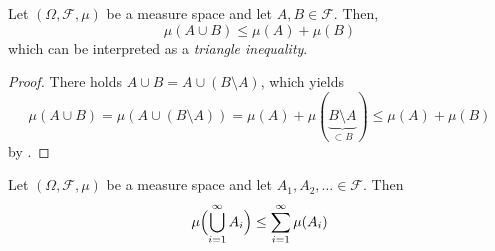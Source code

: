 \begin{theorem}\label{thm:triangle-inequality}
Let $(\Omega,\mathcal{F},\mu)$ be a measure space and let $A,B \in \mathcal{F}$.
Then,
\[
  \mu(A \cup B) \le \mu(A) + \mu(B)
\]
which can be interpreted as a \emph{triangle inequality}.
\end{theorem}

\begin{proof}
There holds $A \cup B = A \cup (B \setminus A)$, which yields
\[
\mu(A \cup B)
=
\mu(A \cup (B \setminus A))
=
\mu(A) + \mu(\underbrace{B \setminus A}_{\subset B})
\le
\mu(A) + \mu(B)
\]
by .
\end{proof}

\begin{theorem}[\textcolor{red}{countable subadditivity}]\label{thm:countable-subadditivity}
Let $(\Omega,\mathcal{F},\mu)$ be a measure space and let $A_1,A_2,\dots \in \mathcal{F}$.
Then
\begin{equation}\label{eq:countable-subadditivity}
\mu\Bigl(\bigcup_{i=1}^{\infty} A_i\Bigr) \leq \sum_{i=1}^{\infty} \mu(A_i)
\qedhere
\end{equation}
\end{theorem}

